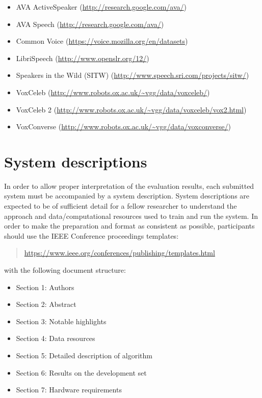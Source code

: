 \documentclass{article}
\begin{document}
\begin{appendices}
\vspace{0.25cm}
\begin{itemize}
    \item AVA ActiveSpeaker (\url{http://research.google.com/ava/})
    \item AVA Speech (\url{http://research.google.com/ava/})
    \item Common Voice (\url{https://voice.mozilla.org/en/datasets})
    \item LibriSpeech (\url{http://www.openslr.org/12/})
    \item Speakers in the Wild (SITW) (\url{http://www.speech.sri.com/projects/sitw/})
    \item VoxCeleb (\url{http://www.robots.ox.ac.uk/~vgg/data/voxceleb/})
    \item VoxCeleb 2 (\url{http://www.robots.ox.ac.uk/~vgg/data/voxceleb/vox2.html})
    \item VoxConverse (\url{http://www.robots.ox.ac.uk/~vgg/data/voxconverse/})
\end{itemize}




\newpage
\section{System descriptions}
\label{app:system}
In order to allow proper interpretation of the evaluation results, each submitted system must be accompanied by a system description. System descriptions are expected to be of sufficient detail for a fellow researcher to understand the approach and data/computational resources used to train and run the system. In order to make the preparation and format as consistent as possible, participants should use the IEEE Conference proceedings templates:
    \begin{quote}
        \url{https://www.ieee.org/conferences/publishing/templates.html}
    \end{quote}
    
with the following document structure:

\begin{itemize}
    \item Section 1: Authors
    \item Section 2: Abstract
    \item Section 3: Notable highlights
    \item Section 4: Data resources
    \item Section 5: Detailed description of algorithm
    \item Section 6: Results on the development set
    \item Section 7: Hardware requirements
\end{itemize}



\end{appendices}
\end{document}
